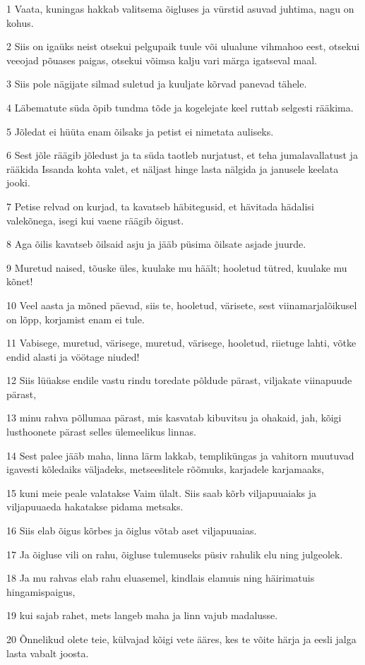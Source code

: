 \par 1 Vaata, kuningas hakkab valitsema õigluses ja vürstid asuvad juhtima, nagu on kohus.
\par 2 Siis on igaüks neist otsekui pelgupaik tuule või ulualune vihmahoo eest, otsekui veeojad põuases paigas, otsekui võimsa kalju vari märga igatseval maal.
\par 3 Siis pole nägijate silmad suletud ja kuuljate kõrvad panevad tähele.
\par 4 Läbematute süda õpib tundma tõde ja kogelejate keel ruttab selgesti rääkima.
\par 5 Jõledat ei hüüta enam õilsaks ja petist ei nimetata auliseks.
\par 6 Sest jõle räägib jõledust ja ta süda taotleb nurjatust, et teha jumalavallatust ja rääkida Issanda kohta valet, et näljast hinge lasta nälgida ja janusele keelata jooki.
\par 7 Petise relvad on kurjad, ta kavatseb häbitegusid, et hävitada hädalisi valekõnega, isegi kui vaene räägib õigust.
\par 8 Aga õilis kavatseb õilsaid asju ja jääb püsima õilsate asjade juurde.
\par 9 Muretud naised, tõuske üles, kuulake mu häält; hooletud tütred, kuulake mu kõnet!
\par 10 Veel aasta ja mõned päevad, siis te, hooletud, värisete, sest viinamarjalõikusel on lõpp, korjamist enam ei tule.
\par 11 Vabisege, muretud, värisege, muretud, värisege, hooletud, riietuge lahti, võtke endid alasti ja vöötage niuded!
\par 12 Siis lüüakse endile vastu rindu toredate põldude pärast, viljakate viinapuude pärast,
\par 13 minu rahva põllumaa pärast, mis kasvatab kibuvitsu ja ohakaid, jah, kõigi lusthoonete pärast selles ülemeelikus linnas.
\par 14 Sest palee jääb maha, linna lärm lakkab, templiküngas ja vahitorn muutuvad igavesti kõledaiks väljadeks, metseeslitele rõõmuks, karjadele karjamaaks,
\par 15 kuni meie peale valatakse Vaim ülalt. Siis saab kõrb viljapuuaiaks ja viljapuuaeda hakatakse pidama metsaks.
\par 16 Siis elab õigus kõrbes ja õiglus võtab aset viljapuuaias.
\par 17 Ja õigluse vili on rahu, õigluse tulemuseks püsiv rahulik elu ning julgeolek.
\par 18 Ja mu rahvas elab rahu eluasemel, kindlais elamuis ning häirimatuis hingamispaigus,
\par 19 kui sajab rahet, mets langeb maha ja linn vajub madalusse.
\par 20 Õnnelikud olete teie, külvajad kõigi vete ääres, kes te võite härja ja eesli jalga lasta vabalt joosta.

